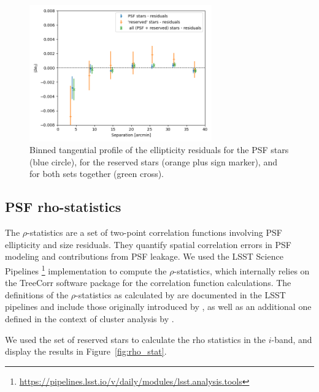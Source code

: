 \documentclass[SE,lsstdraft,authoryear,toc]{lsstdoc}
\begin{document}
\begin{figure}
\centering
\includegraphics[width=0.7\textwidth]{Figures/residual_tan_profile_CLMM.png}
\caption{Binned tangential profile of the ellipticity residuals for the PSF stars (blue circle), for the reserved stars (orange plus sign marker), and for both sets together (green cross).\label{fig:res_profile}}
\end{figure}


\subsection{PSF rho-statistics}
The $\rho$-statistics \citep{2010MNRAS.404..350R, 2016MNRAS.460.2245J} are a set of two-point correlation functions involving PSF ellipticity and size residuals. They quantify spatial correlation errors in PSF modeling and contributions from PSF leakage. We used the LSST Science Pipelines \footnote{\url{https://pipelines.lsst.io/v/daily/modules/lsst.analysis.tools}} implementation to compute the $\rho$-statistics, which internally relies on the TreeCorr software package \citep{2015ascl.soft08007J} for the correlation function calculations. The definitions of the $\rho$-statistics as calculated by  are documented in the LSST pipelines and include those originally introduced by \citet{2010MNRAS.404..350R, 2016MNRAS.460.2245J}, as well as an additional one defined in the context of cluster analysis by \citet{2015MNRAS.449.2219M}.

We used the set of reserved stars to calculate the rho statistics in the $i$-band, and display the results in Figure~\ref{fig:rho_stat}.
\end{document}
